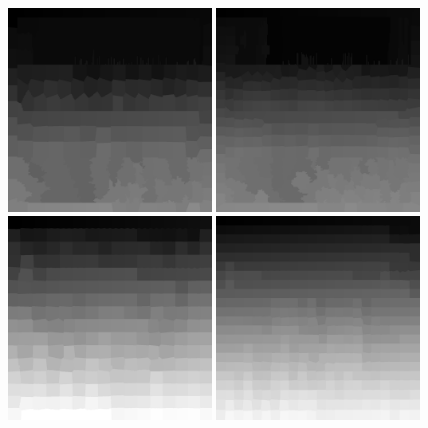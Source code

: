 \documentclass[
  12pt,
]{book}
\begin{document}
\begin{figure}

{\centering \includegraphics[width=0.48\textwidth]{../imgs/slic_5_250} \includegraphics[width=0.48\textwidth]{../imgs/slic_5_500} \includegraphics[width=0.48\textwidth]{../imgs/slic_200_250} \includegraphics[width=0.48\textwidth]{../imgs/slic_200_500} 

}
\end{figure}
\end{document}
